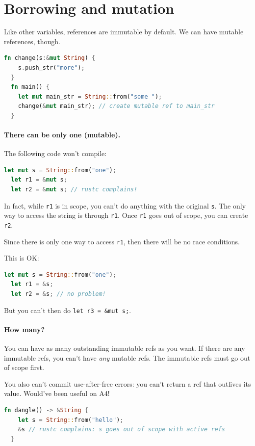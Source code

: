 \documentclass[a4paper]{report}
\begin{document}
\section*{Borrowing and mutation} Like other variables, references are immutable by default.
We can have mutable references, though.
\begin{lstlisting}[language=Rust]
  fn change(s:&mut String) {
    s.push_str("more");
  }
  fn main() {
    let mut main_str = String::from("some ");
    change(&mut main_str); // create mutable ref to main_str
  }
\end{lstlisting}

\paragraph{There can be only one (mutable).} The following code won't compile:
\begin{lstlisting}[language=Rust]
  let mut s = String::from("one");
  let r1 = &mut s;
  let r2 = &mut s; // rustc complains!
\end{lstlisting}
In fact, while {\tt r1} is in scope, you can't do anything with the original {\tt s}.
The only way to access the string is through {\tt r1}. Once {\tt r1} goes out of scope,
you can create {\tt r2}.

Since there is only one way to access {\tt r1}, then there will be no race conditions.

This is OK:
\begin{lstlisting}[language=Rust]
  let mut s = String::from("one");
  let r1 = &s;
  let r2 = &s; // no problem!
\end{lstlisting}
But you can't then do {\tt let r3 = \&mut s;}.

\paragraph{How many?} You can have as many outstanding immutable refs as you want.
If there are any immutable refs, you can't have \emph{any} mutable refs. The immutable
refs must go out of scope first.

You also can't commit use-after-free errors: you can't return a ref that outlives
its value. Would've been useful on A4!
\begin{lstlisting}[language=Rust]
  fn dangle() -> &String {
    let s = String::from("hello");
    &s // rustc complains: s goes out of scope with active refs
  }
\end{lstlisting}
\end{document}
